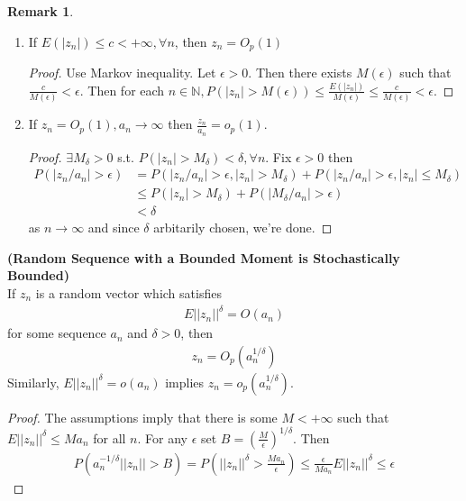 \documentclass[11pt]{article} %
\theoremstyle{definition}
\numberwithin{defn}{subsection}
\numberwithin{thm}{subsection}
\newtheorem*{rmk}{Remark}
\numberwithin{ex}{subsection}
\newcommand{\bb}[1]{\mathbb{#1}}
\newcommand{\N}{\bb{N}}
\newcommand{\ninfty}{n\rightarrow\infty}
\begin{document}
\begin{rmk}
\begin{enumerate}
		\item If $E(|z_n|)\le c<+\infty,\forall n$, then $z_n=O_p(1)$
		\begin{proof}
			Use Markov inequality. Let $\epsilon>0$. Then there exists $M(\epsilon)$ such that $\frac{c}{M(\epsilon)}<\epsilon$. Then for each $n\in\N,P(|z_n|>M(\epsilon))\le \frac{E(|z_n|)}{M(\epsilon)}\le \frac{c}{M(\epsilon)}<\epsilon$.
		\end{proof}
		\item If $z_n=O_p(1), a_n\rightarrow\infty$ then $\frac{z_n}{a_n}=o_p(1)$.
		\begin{proof}
			$\exists M_{\delta}>0$ s.t. $P(|z_n|>M_{\delta})<\delta,\forall n$. Fix $\epsilon>0$ then
			\begin{align*}
			P(|z_n/a_n|>\epsilon)&=P(|z_n/a_n|>\epsilon,|z_n|>M_{\delta})+P(|z_n/a_n|>\epsilon,|z_n|\le M_{\delta})\\
			&\le P(|z_n|>M_{\delta})+P(|M_{\delta}/a_n|>\epsilon)\\
			&<\delta
			\end{align*}
			as $\ninfty$ and since $\delta$ arbitarily chosen, we're done.
		\end{proof}
	\end{enumerate}
\end{rmk}

\begin{thm}
	\textbf{(Random Sequence with a Bounded Moment is Stochastically Bounded)}\\
	If $z_n$ is a random vector which satisfies
	\begin{align*}
	E||z_n||^{\delta}=O(a_n)
	\end{align*}
	for some sequence $a_n$ and $\delta>0$, then
	\begin{align*}
	z_n=O_p(a_n^{1/\delta})
	\end{align*}
	Similarly, $E||z_n||^{\delta}=o(a_n)$ implies $z_n=o_p(a_n^{1/\delta}).$
	
	\begin{proof}
		The assumptions imply that there is some $M<+\infty$ such that $E||z_n||^{\delta}\le Ma_n$ for all $n$. For any $\epsilon$ set $B=(\frac{M}{\epsilon})^{1/\delta}$. Then
		\begin{align*}
		P(a_n^{-1/\delta}||z_n||>B)=P(||z_n||^{\delta}>\frac{Ma_n}{\epsilon})\le\frac{\epsilon}{Ma_n}E||z_n||^{\delta}\le\epsilon
		\end{align*}
	\end{proof}
\end{thm}
\end{document}
